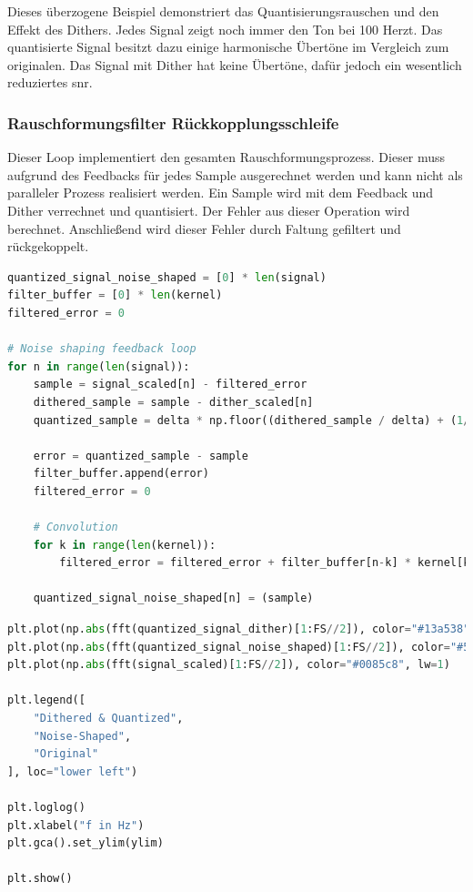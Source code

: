 Dieses überzogene Beispiel demonstriert das Quantisierungsrauschen und
den Effekt des Dithers. Jedes Signal zeigt noch immer den Ton bei 100
Herzt. Das quantisierte Signal besitzt dazu einige harmonische Übertöne
im Vergleich zum originalen. Das Signal mit Dither hat keine Übertöne,
dafür jedoch ein wesentlich reduziertes \gls{snr}.

\hypertarget{rauschformungsfilter-ruxfcckkopplungsschleife}{%
\subsubsection{Rauschformungsfilter
Rückkopplungsschleife}\label{rauschformungsfilter-ruxfcckkopplungsschleife}}

Dieser Loop implementiert den gesamten Rauschformungsprozess. Dieser
muss aufgrund des Feedbacks für jedes Sample ausgerechnet werden und
kann nicht als paralleler Prozess realisiert werden. Ein Sample wird mit
dem Feedback und Dither verrechnet und quantisiert. Der Fehler aus
dieser Operation wird berechnet. Anschließend wird dieser Fehler durch
Faltung gefiltert und rückgekoppelt.

\begin{lstlisting}[language=Python]
quantized_signal_noise_shaped = [0] * len(signal)
filter_buffer = [0] * len(kernel)
filtered_error = 0

# Noise shaping feedback loop
for n in range(len(signal)):
    sample = signal_scaled[n] - filtered_error
    dithered_sample = sample - dither_scaled[n]
    quantized_sample = delta * np.floor((dithered_sample / delta) + (1/2))

    error = quantized_sample - sample
    filter_buffer.append(error)
    filtered_error = 0

    # Convolution
    for k in range(len(kernel)):
        filtered_error = filtered_error + filter_buffer[n-k] * kernel[k]

    quantized_signal_noise_shaped[n] = (sample)
\end{lstlisting}

\begin{lstlisting}[language=Python]
plt.plot(np.abs(fft(quantized_signal_dither)[1:FS//2]), color="#13a538", lw=1)
plt.plot(np.abs(fft(quantized_signal_noise_shaped)[1:FS//2]), color="#59358c", lw=1)
plt.plot(np.abs(fft(signal_scaled)[1:FS//2]), color="#0085c8", lw=1)

plt.legend([
    "Dithered & Quantized",
    "Noise-Shaped",
    "Original"
], loc="lower left")

plt.loglog()
plt.xlabel("f in Hz")
plt.gca().set_ylim(ylim)

plt.show()
\end{lstlisting}

